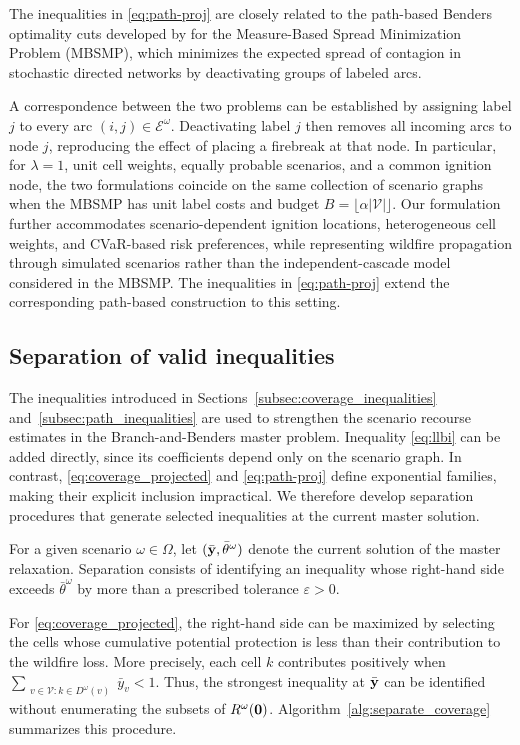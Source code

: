 \documentclass[a4paper,fleqn]{cas-sc}
\begin{document}
The inequalities in \eqref{eq:path-proj} are closely related to the
path-based Benders optimality cuts developed by
\citet{taninmics2024benders} for the Measure-Based Spread Minimization
Problem (MBSMP), which minimizes the expected spread of contagion
in stochastic directed networks by deactivating groups of labeled arcs.

A correspondence between the two problems can be established by
assigning label $j$ to every arc $(i,j)\in\mathcal{E}^{\omega}$.
Deactivating label $j$ then removes all incoming arcs to node $j$,
reproducing the effect of placing a firebreak at that node.
In particular, for $\lambda=1$, unit cell weights, equally
probable scenarios, and a common ignition node, the two formulations
coincide on the same collection of scenario graphs when the MBSMP
has unit label costs and budget
$B=\lfloor\alpha|\mathcal{V}|\rfloor$. Our formulation further accommodates scenario-dependent ignition
locations, heterogeneous cell weights, and CVaR-based risk preferences,
while representing wildfire propagation through simulated scenarios
rather than the independent-cascade model considered in the MBSMP.
The inequalities in \eqref{eq:path-proj} extend the corresponding
path-based construction to this setting.


\subsection{Separation of valid inequalities}
\label{subsec:separation}

The inequalities introduced in Sections~\ref{subsec:coverage_inequalities}
and~\ref{subsec:path_inequalities} are used to strengthen the scenario recourse estimates in the Branch-and-Benders master problem. Inequality \eqref{eq:llbi} can be added directly, since its coefficients depend only on the scenario graph. In contrast, \eqref{eq:coverage_projected} and \eqref{eq:path-proj} define exponential families, making their explicit inclusion impractical. We therefore develop separation procedures that generate selected inequalities at the current master solution.

For a given scenario $\omega\in\Omega$, let
$(\bar{\vb{y}},\bar\theta^\omega)$ denote the current solution of the master relaxation. Separation consists of identifying an inequality whose right-hand side exceeds $\bar\theta^\omega$ by more than a prescribed tolerance $\varepsilon>0$.

For \eqref{eq:coverage_projected}, the right-hand side can be
maximized by selecting the cells whose cumulative potential
protection is less than their contribution to the wildfire loss.
More precisely, each cell $k$ contributes positively when
$\sum_{\substack{v\in\mathcal V: k\in D^\omega(v)}}\bar y_v<1$. Thus, the strongest inequality at $\bar{\vb{y}}$ can be
identified without enumerating the subsets of
$R^\omega(\vb{0})$. Algorithm~\ref{alg:separate_coverage}
summarizes this procedure.
\end{document}
